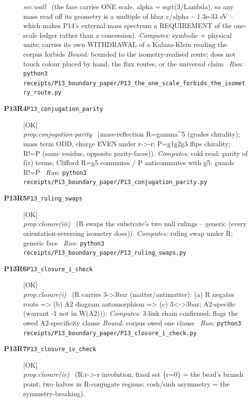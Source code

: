 \begin{description}
\textit{sec:wall} \ (the face carries ONE scale, alpha = sqrt(3/Lambda), so any mass read off its geometry is a multiple of hbar c/alpha \textasciitilde{} 1.3e-33 eV -- which makes P14's external mass spectrum a REQUIREMENT of the one-scale ledger rather than a concession). 
\emph{Computes:} symbolic + physical units; carries its own WITHDRAWAL of a Kaluza-Klein reading the corpus forbids
 \emph{Bound:} bounded to the isometry-realised route; does not touch colour placed by hand, the flux routes, or the universal claim
\ \emph{Run:} \texttt{python3 receipts/P13\_boundary\_paper/P13\_the\_one\_scale\_forbids\_the\_isometry\_route.py}
\item[\rcptlabel{P13_conjugation_parity}{P13R4}\textbf{P13R4}\quad\texttt{P13\_conjugation\_parity}]\hfill\textsf{[OK]}\\
\textit{prop:conjugation-parity} \ (mass-reflection R=gamma\textasciicircum{}5 (grades chirality); mass term ODD, charge EVEN under r->-r; P=g1g2g3 flips chirality; R!=P (same residue, opposite parity-faces)). 
\emph{Computes:} cold read: parity of f(r) terms; Clifford R=g5 commutes / P anticommutes with g5; guards R!=P
\ \emph{Run:} \texttt{python3 receipts/P13\_boundary\_paper/P13\_conjugation\_parity.py}
\item[\rcptlabel{P13_ruling_swaps}{P13R5}\textbf{P13R5}\quad\texttt{P13\_ruling\_swaps}]\hfill\textsf{[OK]}\\
\textit{prop:closure(iii)} \ (R swaps the substrate's two null rulings -- generic (every orientation-reversing isometry does)). 
\emph{Computes:} ruling swap under R; generic face
\ \emph{Run:} \texttt{python3 receipts/P13\_boundary\_paper/P13\_ruling\_swaps.py}
\item[\rcptlabel{P13_closure_i_check}{P13R6}\textbf{P13R6}\quad\texttt{P13\_closure\_i\_check}]\hfill\textsf{[OK]}\\
\textit{prop:closure(i)} \ (R carries 3->3bar (matter/antimatter): (a) R negates roots => (b) A2 diagram automorphism => (c) 3<->3bar; A2-specific (warrant -1 not in W(A2))). 
\emph{Computes:} 3-link chain confirmed; flags the owed A2-specificity clause
 \emph{Bound:} corpus owed one clause
\ \emph{Run:} \texttt{python3 receipts/P13\_boundary\_paper/P13\_closure\_i\_check.py}
\item[\rcptlabel{P13_closure_iv_check}{P13R7}\textbf{P13R7}\quad\texttt{P13\_closure\_iv\_check}]\hfill\textsf{[OK]}\\
\textit{prop:closure(iv)} \ (R:r->-r involution, fixed set \{r=0\} = the bead's branch point; two halves in R-conjugate regions; cosh/sinh asymmetry = the symmetry-breaking). 

\end{description}
